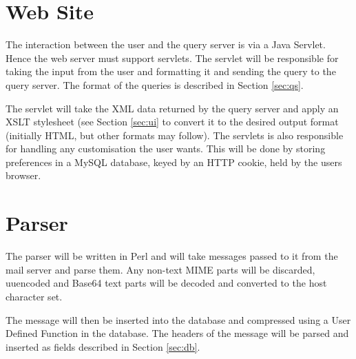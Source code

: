 \section{Web Site}
The interaction between the user and the query server is via a Java Servlet.  Hence the web server must support servlets.  The servlet will be responsible for taking the input from the user and formatting it and sending the query to the query server.  The format of the queries is described in Section \ref{sec:qs}.  

The servlet will take the XML data returned by the query server and apply an XSLT stylesheet (see Section \ref{sec:ui} to convert it to the desired output format (initially HTML, but other formats may follow).  The servlets is also responsible for handling any customisation the user wants.  This will be done by storing preferences in a MySQL database, keyed by an HTTP cookie, held by the users browser.

\section{Parser}
The parser will be written in Perl and will take messages passed to it from the mail server and parse them.  Any non-text MIME parts will be discarded, uuencoded and Base64 text parts will be decoded and converted to the host character set.

The message will then be inserted into the database and compressed using a User Defined Function in the database.  The headers of the message will be parsed and inserted as fields described in Section \ref{sec:db}.

